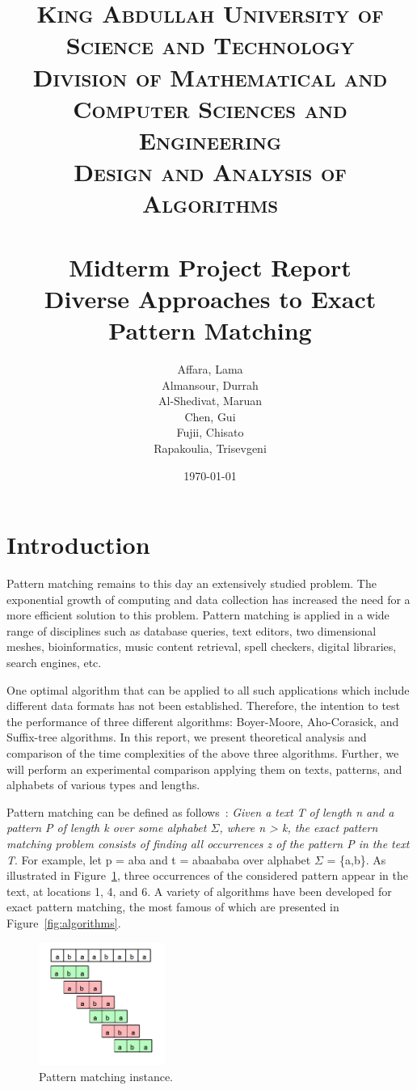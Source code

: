 \documentclass[paper=a4, fontsize=11pt]{scrartcl} %
\title{
\normalfont \normalsize
\textsc{King Abdullah University of Science and Technology\\
        Division of Mathematical and Computer Sciences and Engineering\\
        Design and Analysis of Algorithms} \\ [25pt] %
\horrule{0.5pt} \\[0.4cm] %
\Large Midterm Project Report\\
\huge Diverse Approaches to Exact Pattern Matching
\horrule{2pt} \\[0.5cm] %
}
\author{Affara, Lama\\
        Almansour, Durrah\\
        Al-Shedivat, Maruan\\
        Chen, Gui\\
        Fujii, Chisato\\
        Rapakoulia, Trisevgeni}
\date{\normalsize\today} %
\numberwithin{equation}{section} %
\numberwithin{figure}{section} %
\numberwithin{table}{section} %
\begin{document}
\begin{titlepage}
\maketitle
\thispagestyle{empty}
\clearpage
\end{titlepage}

\section{Introduction}
\par Pattern matching remains to this day an extensively studied problem. The exponential growth of computing and data collection has increased the need for a more efficient solution to this problem. Pattern matching is applied in a wide range of disciplines such as database queries, text editors, two dimensional meshes, bioinformatics, music content retrieval, spell checkers, digital libraries, search engines, etc.

\par One optimal algorithm that can be applied to all such applications which include different data formats has not been established. Therefore, the intention to test the performance of three different algorithms: Boyer-Moore, Aho-Corasick, and Suffix-tree algorithms. In this report, we present theoretical analysis and comparison of the time complexities of the above three algorithms. Further, we will perform an experimental comparison applying them on texts, patterns, and alphabets of various types and lengths.

\par Pattern matching can be defined as follows~\cite{intro}: \textit{Given a text T of length n and a pattern P of length k over some alphabet $\Sigma$, where n > k, the exact pattern matching problem consists of finding all occurrences z of the pattern P in the text T}. For example, let p = aba and t = abaababa over alphabet $\Sigma$ = \{a,b\}. As illustrated in Figure~\ref{fig:matching}, three occurrences of the considered pattern appear in the text, at locations 1, 4, and 6. A variety of algorithms have been developed for exact pattern matching, the most famous of which are presented in Figure~\ref{fig:algorithms}.

\begin{figure}[h!]
\centering
\includegraphics[width=0.37\textwidth]{figures/matching.png}
\caption{Pattern matching instance.}
\label{fig:matching}
\end{figure}
\end{document}
